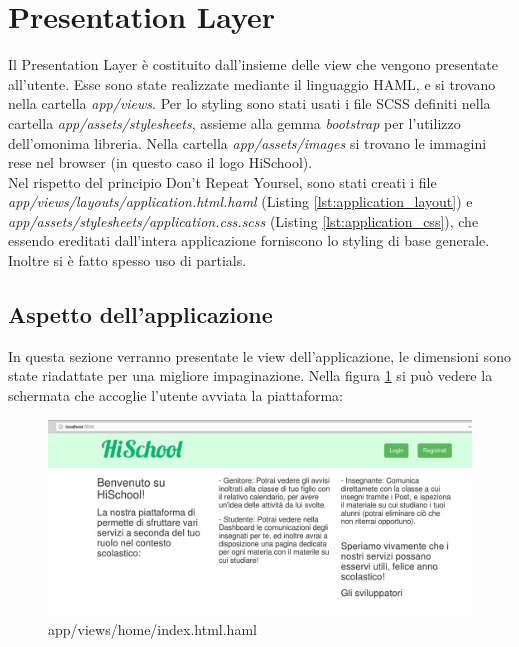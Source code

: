 \documentclass[Lau, binding=0.6cm, oneside]{sapthesis}
\begin{document}
\section{Presentation Layer}

Il Presentation Layer è costituito dall'insieme delle view che vengono presentate all'utente. Esse sono state realizzate mediante il linguaggio HAML, e si trovano nella cartella \textit{app/views}. Per lo styling sono stati usati i file SCSS definiti nella cartella \textit{app/assets/stylesheets}, assieme alla gemma \textit{bootstrap} per l'utilizzo dell'omonima libreria. Nella cartella \textit{app/assets/images} si trovano le immagini rese nel browser (in questo caso il logo HiSchool).\\
Nel rispetto del principio Don't Repeat Yoursel, sono stati creati i file \textit{app/views/layouts/application.html.haml} (Listing \ref{lst:application_layout}) e \textit{app/assets/stylesheets/application.css.scss} (Listing \ref{lst:application_css}), che essendo ereditati dall'intera applicazione forniscono lo styling di base generale.\\
Inoltre si è fatto spesso uso di partials.

\lstset{language=HAML, , captionpos=b, frame=single}


\lstset{language=CSS, , captionpos=b, frame=single}


\subsection{Aspetto dell'applicazione}
In questa sezione verranno presentate le view dell'applicazione, le dimensioni sono state riadattate per una migliore impaginazione. Nella figura \ref{fig:home_page} si può vedere la schermata che accoglie l'utente avviata la piattaforma:

\begin{figure}[H]
	\centering
	\includegraphics[width=1\linewidth]{images/home_page} 
	\caption{app/views/home/index.html.haml}
	\label{fig:home_page}
\end{figure}
\end{document}
